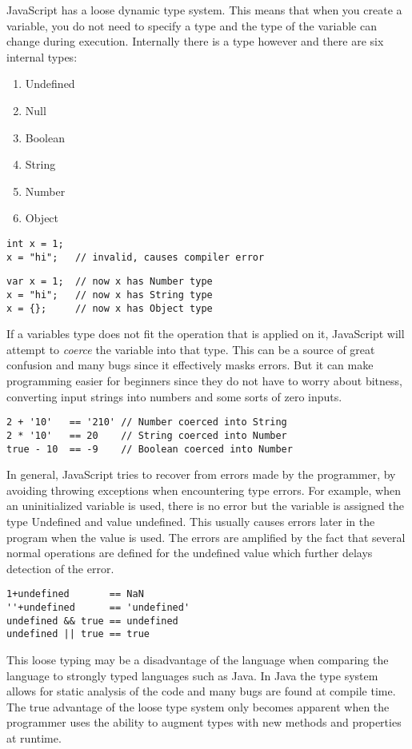 JavaScript has a loose dynamic type system. This means that when you create a variable, you do not need to specify a type and the type of the variable can change during execution. Internally there is a type however and there are six internal types:
	\begin{enumerate}
	\item Undefined
	\item Null
	\item Boolean
	\item String
	\item Number
	\item Object
	\end{enumerate}
\begin{lstlisting}[caption=Changing type of variable in Java]
int x = 1;
x = "hi";   // invalid, causes compiler error
\end{lstlisting}

\begin{lstlisting}[caption=Changing type of variable in JavaScript]
var x = 1;  // now x has Number type
x = "hi";   // now x has String type
x = {};     // now x has Object type
\end{lstlisting}
	If a variables type does not fit the operation that is applied on it, JavaScript will attempt to \emph{coerce} the variable into that type. This can be a source of great confusion and many bugs since it effectively masks errors. But it can make programming easier for beginners since they do not have to worry about bitness, converting input strings into numbers and some sorts of zero inputs.
\begin{lstlisting}[caption=Automatic type coercion]
2 + '10'   == '210' // Number coerced into String
2 * '10'   == 20    // String coerced into Number
true - 10  == -9    // Boolean coerced into Number
\end{lstlisting}

	In general, JavaScript tries to recover from errors made by the programmer, by avoiding throwing exceptions when encountering type errors. For example, when an uninitialized variable is used, there is no error but the variable is assigned the type Undefined and value undefined. This usually causes errors later in the program when the value is used. The errors are amplified by the fact that several normal operations are defined for the undefined value which further delays detection of the error.
\begin{lstlisting}[caption=Normal operations on undefined value]
1+undefined       == NaN
''+undefined      == 'undefined'
undefined && true == undefined
undefined || true == true
\end{lstlisting}	
This loose typing may be a disadvantage of the language when comparing the language to strongly typed languages such as Java. In Java the type system allows for static analysis of the code and many bugs are found at compile time. The true advantage of the loose type system only becomes apparent when the programmer uses the ability to augment types with new methods and properties at runtime.

